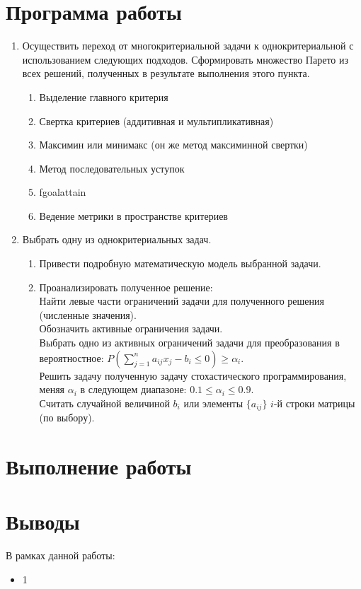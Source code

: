 





\tableofcontents
\newpage

\section{Программа работы}

\begin{enumerate}
	\item Осуществить переход от многокритериальной задачи к однокритериальной с использованием следующих подходов.  Сформировать множество Парето из всех решений, полученных в результате выполнения этого пункта.
		\begin{enumerate}
			\item Выделение главного критерия
			\item Свертка критериев (аддитивная и мультипликативная)
			\item Максимин или минимакс (он же метод максиминной свертки)
			\item Метод последовательных уступок
			\item fgoalattain 
			\item Ведение метрики в пространстве критериев
		\end{enumerate}
	\item Выбрать одну из однокритериальных задач.
		\begin{enumerate}
			\item Привести подробную математическую модель выбранной задачи.
			\item Проанализировать полученное решение:\\
			Найти левые части ограничений задачи для полученного решения (численные значения).\\
			Обозначить активные ограничения задачи.\\
			Выбрать одно из активных ограничений задачи для преобразования в вероятностное: 
			$P\left( \sum_{j=1}^n a_{ij} x_j - b_i \leq 0 \right) \geq \alpha_i$.\\
			Решить задачу полученную задачу стохастического программирования, меняя $\alpha_i$ в следующем диапазоне: $0.1 \leq \alpha_i \leq 0.9$.\\
			Считать случайной величиной $b_i$ или элементы $\{a_{ij}\}$ $i$-й строки матрицы    (по выбору).
		\end{enumerate}
\end{enumerate}

\newpage

\section{Выполнение работы}


\section{Выводы}

В рамках данной работы:

\begin{itemize}
	\item 1
\end{itemize}


